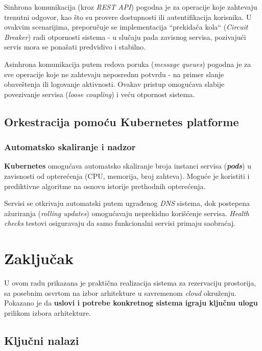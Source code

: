 \documentclass[12pt]{article}
\begin{document}
    Sinhrona komunikacija (kroz \textit{REST API}) pogodna je za operacije koje zahtevaju trenutni odgovor, 
    kao što su provere dostupnosti ili autentifikacija korisnika. U ovakvim scenarijima, preporučuje se 
    implementacija ``prekidača kola`` (\textit{Circuit Breaker}) radi otpornosti sistema - u slučaju 
    pada zavisnog servisa, pozivajući servis mora se ponašati predvidivo i stabilno.

    Asinhrona komunikacija putem redova poruka (\textit{message queues}) pogodna je za sve 
    operacije koje ne zahtevaju neposrednu potvrdu - na primer slanje obaveštenja ili 
    logovanje aktivnosti. Ovakav pristup omogućava slabije povezivanje servisa (\textit{loose coupling}) 
    i veću otpornost sistema.

    \newpage

    \subsection{Orkestracija pomoću Kubernetes platforme}

    \subsubsection*{Automatsko skaliranje i nadzor}

    \textbf{Kubernetes} omogućava automatsko skaliranje broja instanci servisa (\textbf{\textit{pods}}) u 
    zavisnosti od opterećenja (CPU, memorija, broj zahteva). Moguće je koristiti i prediktivne 
    algoritme na osnovu istorije prethodnih opterećenja.

    Servisi se otkrivaju automatski putem ugrađenog \textit{DNS} sistema, dok
    postepena ažuriranja (\textit{rolling updates}) omogućavaju neprekidno korišćenje servisa. \textit{Health checks} testovi osiguravaju da 
    samo funkcionalni servisi primaju saobraćaj.

    \newpage
    \section{Zaključak}

    U ovom radu prikazana je praktična realizacija sistema za rezervaciju prostorija, sa 
    posebnim osvrtom na izbor arhitekture u savremenom \textit{cloud} okruženju. Pokazano je 
    da \textbf{uslovi i potrebe konkretnog sistema igraju ključnu ulogu} prilikom 
    izbora arhitekture.

    \subsection*{Ključni nalazi}
\end{document}
